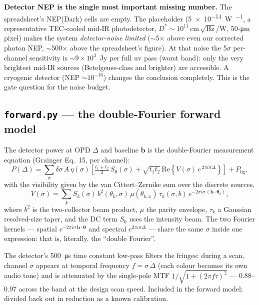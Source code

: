 \documentclass[11pt]{article}
\newcommand{\file}[1]{\textcolor{plumdark}{\texttt{\small #1}}}
\begin{document}
\begin{flagbox}
\textbf{Detector NEP is the single most important missing number.} The
spreadsheet's NEP(Dark) cells are empty. The placeholder
(\SI{5e-14}{\watt\per\sqrt{\hertz}}, a representative TEC-cooled mid-IR
photodetector, $D^*\!\sim\!10^{11}$\,cm\,$\sqrt{\mathrm{Hz}}$/W, 50-\si{\micro\metre}
pixel) makes the system \emph{detector-noise limited} ($\sim$5$\times$ above
even our corrected photon NEP, $\sim$500$\times$ above the spreadsheet's
figure). At that noise the 5$\sigma$ per-channel sensitivity is
$\sim 9\times10^3$~Jy per full uv pass (worst band): only the very brightest mid-IR
sources (Betelgeuse-class and brighter) are accessible. A cryogenic detector
(NEP $\sim 10^{-16}$) changes the conclusion completely. This is the gate
question for the noise budget.
\end{flagbox}

\subsection{\file{forward.py} --- the double-Fourier forward model}

\begin{physicsbox}
The detector power at OPD $\Delta$ and baseline $\mathbf b$ is the
double-Fourier measurement equation (Grainger Eq.~15, per channel):
\begin{equation}
P(\Delta) = \sum_\sigma \delta\sigma\, A\,\eta(\sigma)\!\left[
\tfrac{t_1+t_2}{2}\,S_0(\sigma) + \sqrt{t_1 t_2}\,
\mathrm{Re}\!\left\{V(\sigma)\, e^{\,2\pi i \sigma\Delta}\right\}\right]
+ P_\mathrm{bg},
\end{equation}
with the visibility given by the van Cittert--Zernike sum over the discrete
sources,
\begin{equation}
V(\sigma) = \sum_k S_k(\sigma)\, b^2(\theta_k,\sigma)\,
\mu(\theta_{k,x})\, \tau_k(\sigma,b)\,
e^{-2\pi i \sigma\,(\mathbf b\cdot\boldsymbol\theta_k)},
\end{equation}
where $b^2$ is the two-collector beam product, $\mu$ the parity envelope,
$\tau_k$ a Gaussian resolved-size taper, and the DC term $S_0$ uses the
intensity beam. The two Fourier kernels --- spatial
$e^{-2\pi i\sigma\,\mathbf b\cdot\boldsymbol\theta}$ and spectral
$e^{2\pi i\sigma\Delta}$ --- share the same $\sigma$ inside one expression:
that is, literally, the ``double Fourier''.

The detector's \SI{500}{\micro\second} time constant low-pass filters the
fringes: during a scan, channel $\sigma$ appears at temporal frequency
$f = \sigma\,\dot\Delta$ (each colour becomes its own audio tone) and is
attenuated by the single-pole MTF $1/\sqrt{1+(2\pi f\tau)^2}$ ---
0.88--0.97 across the band at the design scan speed. Included in the forward
model; divided back out in reduction as a known calibration.
\end{physicsbox}
\end{document}
